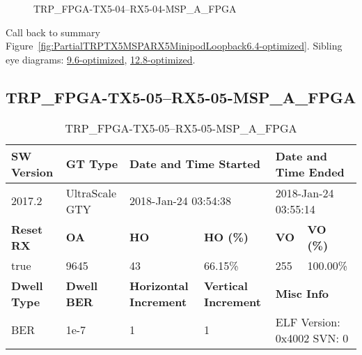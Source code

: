 \begin{figure}[h]
\caption{TRP\_FPGA-TX5-04--RX5-04-MSP\_A\_FPGA} \label{fig:TRPFPGATX504RX504MSPAFPGA6.4-optimized}
\end{figure}

Call back to summary Figure~\ref{fig:PartialTRPTX5MSPARX5MinipodLoopback6.4-optimized}.
Sibling eye diagrams: \hyperref[sec:TRPFPGATX504RX504MSPAFPGA9.6-optimized]{9.6-optimized}, \hyperref[sec:TRPFPGATX504RX504MSPAFPGA12.8-optimized]{12.8-optimized}.

\clearpage
\newpage


\subsection{TRP\_FPGA-TX5-05--RX5-05-MSP\_A\_FPGA}\label{sec:TRPFPGATX505RX505MSPAFPGA6.4-optimized}

\begin{table}[h]
\centering
\caption{TRP\_FPGA-TX5-05--RX5-05-MSP\_A\_FPGA}
\label{tab:TRPFPGATX505RX505MSPAFPGA6.4-optimized}
\begin{tabular}{@{}|l|l|l|l|l|l|@{}}
\toprule
\textbf{SW Version}                & \textbf{GT Type}   & \multicolumn{2}{l|}{\textbf{Date and Time Started}}            & \multicolumn{2}{l|}{\textbf{Date and Time Ended}}        \\ \midrule
2017.2                       & UltraScale GTY          & \multicolumn{2}{l|}{2018-Jan-24 03:54:38}                   & \multicolumn{2}{l|}{2018-Jan-24 03:55:14}               \\ \midrule
\textbf{Reset RX}                  & \textbf{OA} & \textbf{HO}   & \textbf{HO (\%)} & \textbf{VO} & \textbf{VO (\%)} \\ \midrule
true & 9645        & 43          & 66.15\%        & 255        & 100.00\%       \\ \midrule
\textbf{Dwell Type}                & \textbf{Dwell BER} & \textbf{Horizontal Increment} & \textbf{Vertical Increment}    & \multicolumn{2}{l|}{\textbf{Misc Info}}                  \\ \midrule
BER                            & 1e-7        & 1        & 1           & \multicolumn{2}{l|}{ELF Version: 0x4002 SVN: 0}                         \\ \bottomrule
\end{tabular}
\end{table}

